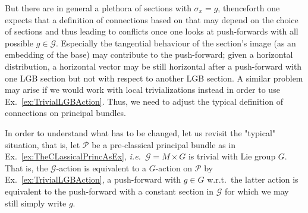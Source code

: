 \documentclass[a4paper,oneside,11pt,bibliography=totoc]{scrartcl}
\theoremstyle{plain}
\theoremstyle{remark}
\theoremstyle{definition}
\begin{document}
\begin{center}
\end{center}

But there are in general a plethora of sections with $\sigma_x= g$, thenceforth one expects that a definition of connections based on that may depend on the choice of sections and thus leading to conflicts once one looks at push-forwards with all possible $g \in \mathcal{G}$. Especially the tangential behaviour of the section's image (as an embedding of the base) may contribute to the push-forward; given a horizontal distribution, a horizontal vector may be still horizontal after a push-forward with one LGB section but not with respect to another LGB section. A similar problem may arise if we would work with local trivializations instead in order to use Ex.\ \ref{ex:TrivialLGBAction}. Thus, we need to adjust the typical definition of connections on principal bundles.

In order to understand what has to be changed, let us revisit the "typical" situation, that is, let $\mathcal{P}$ be a pre-classical principal bundle as in Ex.\ \ref{ex:TheCLassicalPrincAsEx}, \textit{i.e.}\ $\mathcal{G} = M \times G$ is trivial with Lie group $G$. That is, the $\mathcal{G}$-action is equivalent to a $G$-action on $\mathcal{P}$ by Ex.\ \ref{ex:TrivialLGBAction}, a push-forward with $g \in G$ w.r.t.\ the latter action is equivalent to the push-forward with a constant section in $\mathcal{G}$ for which we may still simply write $g$.
\end{document}
